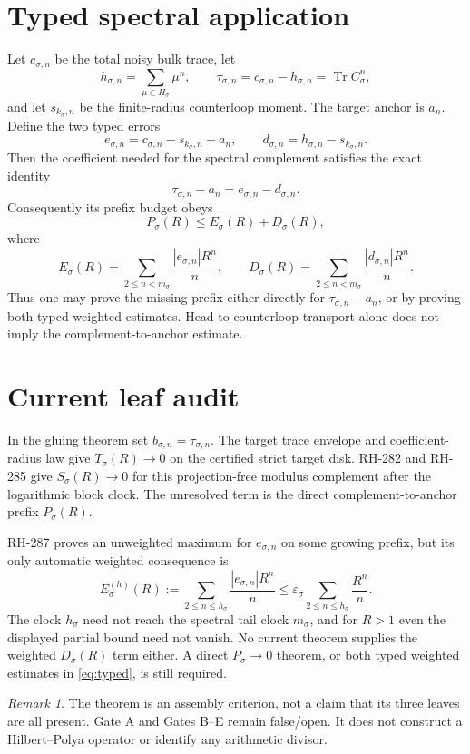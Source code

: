 \documentclass[11pt]{article}
\theoremstyle{remark}\newtheorem{remark}[theorem]{Remark}
\newcommand{\Tr}{\operatorname{Tr}}
\begin{document}
\section{Typed spectral application}
Let $c_{\sigma,n}$ be the total noisy bulk trace, let
\[
 h_{\sigma,n}=\sum_{\mu\in H_\sigma}\mu^n,
 \qquad
 \tau_{\sigma,n}=c_{\sigma,n}-h_{\sigma,n}
                  =\Tr C_\sigma^n,
\]
and let $s_{k_\sigma,n}$ be the finite-radius counterloop moment.  The target
anchor is $a_n$.  Define the two typed errors
\[
 e_{\sigma,n}=c_{\sigma,n}-s_{k_\sigma,n}-a_n,
 \qquad
 d_{\sigma,n}=h_{\sigma,n}-s_{k_\sigma,n}.
\]
Then the coefficient needed for the spectral complement satisfies the exact
identity
\begin{equation}\label{eq:typed}
 \tau_{\sigma,n}-a_n=e_{\sigma,n}-d_{\sigma,n}.
\end{equation}
Consequently its prefix budget obeys
\[
 P_\sigma(R)\le E_\sigma(R)+D_\sigma(R),
\]
where
\[
 E_\sigma(R)=\sum_{2\le n<m_\sigma}
 \frac{|e_{\sigma,n}|R^n}{n},\qquad
 D_\sigma(R)=\sum_{2\le n<m_\sigma}
 \frac{|d_{\sigma,n}|R^n}{n}.
\]
Thus one may prove the missing prefix either directly for
$\tau_{\sigma,n}-a_n$, or by
proving both typed weighted estimates.  Head-to-counterloop transport alone
does not imply the complement-to-anchor estimate.

\section{Current leaf audit}
In the gluing theorem set $b_{\sigma,n}=\tau_{\sigma,n}$.  The target trace
envelope and coefficient-radius law give $T_\sigma(R)\to0$ on the certified
strict target disk.  RH-282 and RH-285 give $S_\sigma(R)\to0$ for this
projection-free modulus complement after the logarithmic block clock.  The
unresolved term is the direct complement-to-anchor prefix $P_\sigma(R)$.

RH-287 proves an unweighted maximum for $e_{\sigma,n}$ on some growing
prefix, but its only automatic weighted consequence is
\[
 E_\sigma^{(h)}(R):=
 \sum_{2\le n\le h_\sigma}\frac{|e_{\sigma,n}|R^n}{n}
 \le\varepsilon_\sigma
 \sum_{2\le n\le h_\sigma}\frac{R^n}{n}.
\]
The clock $h_\sigma$ need not reach the spectral tail clock $m_\sigma$, and
for $R>1$ even the displayed partial bound need not vanish.  No current
theorem supplies the weighted
$D_\sigma(R)$ term either.  A direct $P_\sigma\to0$ theorem, or both typed
weighted estimates in \eqref{eq:typed}, is still required.

\begin{remark}
The theorem is an assembly criterion, not a claim that its three leaves are
all present.  Gate A and Gates B--E remain false/open.  It does not construct
a Hilbert--Polya operator or identify any arithmetic divisor.
\end{remark}
\end{document}
